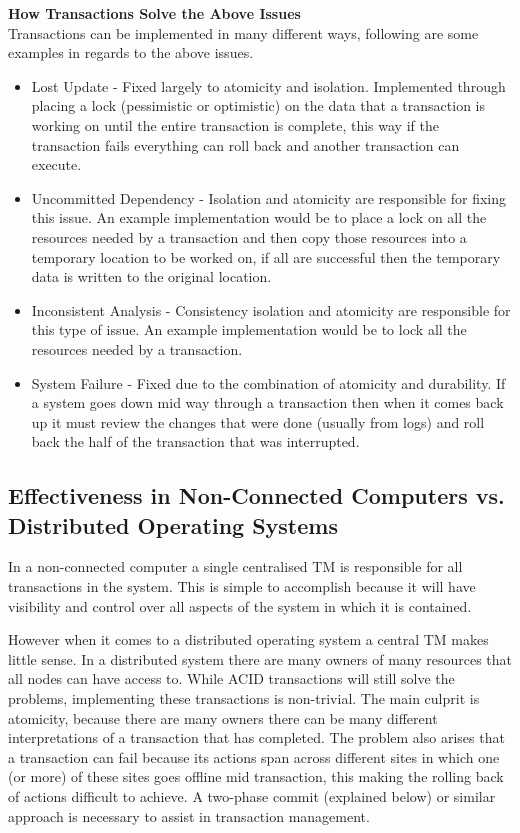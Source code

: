 \documentclass[a4paper,12pt]{article}
\begin{document}
\par\textbf{How Transactions Solve the Above Issues}\\
Transactions can be implemented in many different ways, following are some examples in regards to the above issues.
\begin{itemize}
    \item{Lost Update - Fixed largely to atomicity and isolation. Implemented through placing a lock (pessimistic or optimistic) on the data that a transaction is working on until the entire transaction is complete, this way if the transaction fails everything can roll back and another transaction can execute.}
    \item{Uncommitted Dependency - Isolation and atomicity are responsible for fixing this issue. An example implementation would be to place a lock on all the resources needed by a transaction and then copy those resources into a temporary location to be worked on, if all are successful then the temporary data is written to the original location.}
    \item{Inconsistent Analysis - Consistency isolation and atomicity are responsible for this type of issue. An example implementation would be to lock all the resources needed by a transaction.}
    \item{System Failure - Fixed due to the combination of atomicity and durability. If a system goes down mid way through a transaction then when it comes back up it must review the changes that were done (usually from logs) and roll back the half of the transaction that was interrupted.}
\end{itemize}

\subsection*{Effectiveness in Non-Connected Computers vs. Distributed Operating Systems}
In a non-connected computer a single centralised TM is responsible for all transactions in the system. 
This is simple to accomplish because it will have visibility and control over all aspects of the system in which it is contained. 

However when it comes to a distributed operating system a central TM makes little sense. 
In a distributed system there are many owners of many resources that all nodes can have access to.
While ACID transactions will still solve the problems, implementing these transactions is non-trivial. The main culprit is atomicity, because there are many owners there can be many different interpretations of a transaction that has completed. 
The problem also arises that a transaction can fail because its actions span across different sites in which one (or more) of these sites goes offline mid transaction, this making the rolling back of actions difficult to achieve.
A two-phase commit (explained below) or similar approach is necessary to assist in transaction management.
\end{document}
